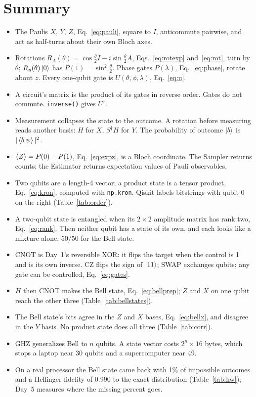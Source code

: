 \documentclass[11pt]{article}
\newcommand{\code}[1]{\texttt{#1}}
\begin{document}
\section{Summary}

\begin{itemize}
\item The Paulis $X$, $Y$, $Z$, Eq.~\eqref{eq:pauli}, square to $I$, anticommute pairwise, and act as half-turns about their own Bloch axes.
\item Rotations $R_A(\theta) = \cos\frac\theta2 I - i\sin\frac\theta2 A$, Eqs.~\eqref{eq:rotexp} and~\eqref{eq:rot}, turn by $\theta$; $R_y(\theta)\ket{0}$ has $P(1) = \sin^2\frac\theta2$. Phase gates $P(\lambda)$, Eq.~\eqref{eq:phase}, rotate about $z$. Every one-qubit gate is $U(\theta,\phi,\lambda)$, Eq.~\eqref{eq:u}.
\item A circuit's matrix is the product of its gates in reverse order. Gates do not commute. \code{inverse()} gives $U^\dagger$.
\item Measurement collapses the state to the outcome. A rotation before measuring reads another basis: $H$ for $X$, $S^\dagger H$ for $Y$. The probability of outcome $\ket{b}$ is $|\braket{b|\psi}|^2$.
\item $\braket{Z} = P(0) - P(1)$, Eq.~\eqref{eq:expz}, is a Bloch coordinate. The Sampler returns counts; the Estimator returns expectation values of Pauli observables.
\item Two qubits are a length-4 vector; a product state is a tensor product, Eq.~\eqref{eq:kron}, computed with \code{np.kron}. Qiskit labels bitstrings with qubit 0 on the right (Table~\ref{tab:order}).
\item A two-qubit state is entangled when its $2\times2$ amplitude matrix has rank two, Eq.~\eqref{eq:rank}. Then neither qubit has a state of its own, and each looks like a mixture alone, 50/50 for the Bell state.
\item CNOT is Day~1's reversible XOR: it flips the target when the control is 1 and is its own inverse. CZ flips the sign of $\ket{11}$; SWAP exchanges qubits; any gate can be controlled, Eq.~\eqref{eq:gates}.
\item $H$ then CNOT makes the Bell state, Eq.~\eqref{eq:bellprep}; $Z$ and $X$ on one qubit reach the other three (Table~\ref{tab:bellstates}).
\item The Bell state's bits agree in the $Z$ and $X$ bases, Eq.~\eqref{eq:bellx}, and disagree in the $Y$ basis. No product state does all three (Table~\ref{tab:corr}).
\item GHZ generalizes Bell to $n$ qubits. A state vector costs $2^n \times 16$ bytes, which stops a laptop near 30 qubits and a supercomputer near 49.
\item On a real processor the Bell state came back with 1\% of impossible outcomes and a Hellinger fidelity of 0.990 to the exact distribution (Table~\ref{tab:hw}); Day~5 measures where the missing percent goes.
\end{itemize}
\end{document}
